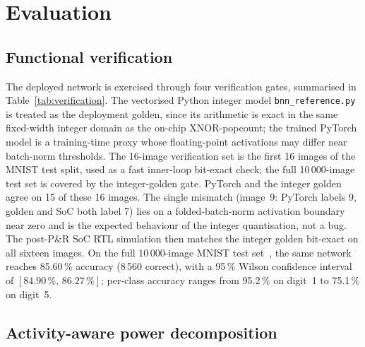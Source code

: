 \documentclass[conference]{IEEEtran}
\begin{document}
\section{Evaluation}
\label{sec:eval}

\subsection{Functional verification}
\label{sec:eval:verif}

The deployed network is exercised through four verification gates,
summarised in Table~\ref{tab:verification}. The vectorised Python
integer model \texttt{bnn\_reference.py} is treated as the deployment
golden, since its arithmetic is exact in the same fixed-width integer
domain as the on-chip XNOR-popcount; the trained PyTorch model is a
training-time proxy whose floating-point activations may differ near
batch-norm thresholds. The 16-image verification set is the first 16 images of the
MNIST test split, used as a fast inner-loop bit-exact check; the
full 10\,000-image test set is covered by the integer-golden gate.
PyTorch and the integer golden agree on 15 of these 16 images. The single mismatch (image~9: PyTorch labels
9, golden and SoC both label 7) lies on a folded-batch-norm activation
boundary near zero and is the expected behaviour of the integer
quantisation, not a bug. The post-P\&R SoC RTL simulation then matches
the integer golden bit-exact on all sixteen images. On the full
10\,000-image MNIST test set~\cite{mnist}, the same network reaches
85.60\,\% accuracy (8\,560 correct), with a 95\,\% Wilson confidence interval of
\([84.90\,\%,\,86.27\,\%]\); per-class accuracy ranges from 95.2\,\%
on digit~1 to 75.1\,\% on digit~5.


\subsection{Activity-aware power decomposition}
\label{sec:eval:power}
\end{document}
